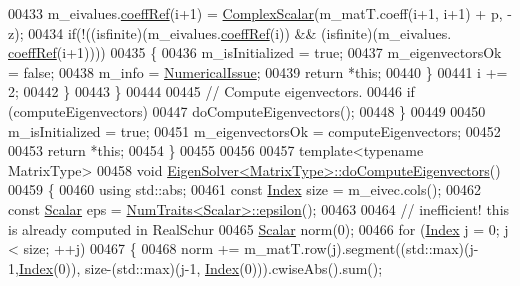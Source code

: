 \begin{DoxyCode}
00433         m\_eivalues.\hyperlink{class_eigen_1_1_plain_object_base_a25626a55b26a4323565f79d1b7c48ea8}{coeffRef}(i+1) = \hyperlink{group___eigenvalues___module_a4d0b2a773357d0a6ec98e026f04002ed}{ComplexScalar}(m\_matT.coeff(i+1, i+1) + p, -z);
00434         \textcolor{keywordflow}{if}(!((isfinite)(m\_eivalues.\hyperlink{class_eigen_1_1_plain_object_base_a25626a55b26a4323565f79d1b7c48ea8}{coeffRef}(i)) && (isfinite)(m\_eivalues.
      \hyperlink{class_eigen_1_1_plain_object_base_a25626a55b26a4323565f79d1b7c48ea8}{coeffRef}(i+1))))
00435         \{
00436           m\_isInitialized = \textcolor{keyword}{true};
00437           m\_eigenvectorsOk = \textcolor{keyword}{false};
00438           m\_info = \hyperlink{group__enums_gga85fad7b87587764e5cf6b513a9e0ee5eaaf9b736d310a664e7729d163a035cc5f}{NumericalIssue};
00439           \textcolor{keywordflow}{return} *\textcolor{keyword}{this};
00440         \}
00441         i += 2;
00442       \}
00443     \}
00444     
00445     \textcolor{comment}{// Compute eigenvectors.}
00446     \textcolor{keywordflow}{if} (computeEigenvectors)
00447       doComputeEigenvectors();
00448   \}
00449 
00450   m\_isInitialized = \textcolor{keyword}{true};
00451   m\_eigenvectorsOk = computeEigenvectors;
00452 
00453   \textcolor{keywordflow}{return} *\textcolor{keyword}{this};
00454 \}
00455 
00456 
00457 \textcolor{keyword}{template}<\textcolor{keyword}{typename} MatrixType>
00458 \textcolor{keywordtype}{void} \hyperlink{group___eigenvalues___module_class_eigen_1_1_eigen_solver}{EigenSolver<MatrixType>::doComputeEigenvectors}()
00459 \{
00460   \textcolor{keyword}{using} std::abs;
00461   \textcolor{keyword}{const} \hyperlink{group___eigenvalues___module_a5bff6a6bc0efac67d52c60c2c3deb9ee}{Index} size = m\_eivec.cols();
00462   \textcolor{keyword}{const} \hyperlink{group___eigenvalues___module_a017d49fe0d59874b70a2fcf35e5aa373}{Scalar} eps = \hyperlink{group___core___module_struct_eigen_1_1_num_traits}{NumTraits<Scalar>::epsilon}();
00463 
00464   \textcolor{comment}{// inefficient! this is already computed in RealSchur}
00465   \hyperlink{group___eigenvalues___module_a017d49fe0d59874b70a2fcf35e5aa373}{Scalar} norm(0);
00466   \textcolor{keywordflow}{for} (\hyperlink{group___eigenvalues___module_a5bff6a6bc0efac67d52c60c2c3deb9ee}{Index} j = 0; j < size; ++j)
00467   \{
00468     norm += m\_matT.row(j).segment((std::max)(j-1,\hyperlink{group___eigenvalues___module_a5bff6a6bc0efac67d52c60c2c3deb9ee}{Index}(0)), size-(std::max)(j-1,
      \hyperlink{group___eigenvalues___module_a5bff6a6bc0efac67d52c60c2c3deb9ee}{Index}(0))).cwiseAbs().sum();

\end{DoxyCode}
